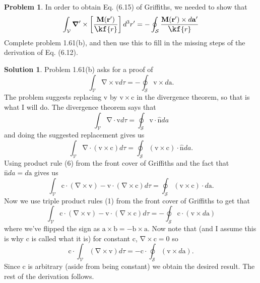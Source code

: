 \documentclass[10pt]{article}
\theoremstyle{definition}
\newtheorem{problem}{Problem}
\newtheorem{soln}{Solution}
\newcommand{\uv}[1]{\hat{\bv{{#1}}}}
\newcommand{\grd}{\nabla}
\newcommand{\scriptr}{\fontsize{12pt}{12pt}\kf{r}\fontsize{10pt}{10pt}}
\newcommand{\bv}[1]{\bm{\mathrm{#1}}}
\begin{document}
\begin{problem}
In order to obtain Eq. (6.15) of Griffiths, we needed to show that
$$\int_\mathcal{V}\bv{\grd}' \times \left[\frac{\bv{M}(\bv{r}')}{\scriptr}\right]d^3r'=-\oint_\mathcal{S}\frac{\bv{M}(\bv{r}')\times d\bv{a}'}{\scriptr}$$
Complete problem 1.61(b), and then use this to fill in the missing steps of the derivation of
Eq. (6.12).
\end{problem}
\begin{soln}
  Problem 1.61(b) asks for a proof of
  $$\int_{\mathcal{V}}\bv{\grd}\times \bv{v}d\tau = -\oint_\mathcal{S}\bv{v}\times d\bv{a}.$$
  The problem suggests replacing $\bv{v}$ by $\bv{v}\times \bv{c}$ in the divergence theorem, so that is what I will do.
  The divergence theorem says that
  $$\int_{\mathcal{V}}\bv{\grd}\cdot \bv{v} d\tau=\oint_\mathcal{S}\bv{v}\cdot \uv{n} da$$
  and doing the suggested replacement gives us
  $$\int_{\mathcal{V}}\bv{\grd}\cdot (\bv{v}\times \bv{c}) d\tau=\oint_\mathcal{S}(\bv{v}\times \bv{c})\cdot \uv{n} da.$$
  Using product rule (6) from the front cover of Griffiths and the fact that $\uv{n} da =d\bv{a}$ gives us
  $$\int_{\mathcal{V}} \bv{c}\cdot (\bv{\grd}\times \bv{v})-\bv{v}\cdot (\bv{\grd}\times \bv{c}) d\tau=\oint_\mathcal{S}(\bv{v}\times \bv{c})\cdot d\bv{a}.$$
  Now we use triple product rules (1) from the front cover of Griffiths to get that
  $$\int_{\mathcal{V}} \bv{c}\cdot (\bv{\grd}\times \bv{v})-\bv{v}\cdot (\bv{\grd}\times \bv{c}) d\tau=-\oint_\mathcal{S}\bv{c}\cdot (\bv{v}\times d\bv{a})$$
  where we've flipped the sign as $\bv{a}\times \bv{b} = -\bv{b}\times \bv{a}$. Now note that (and I assume this is why $\bv{c}$ is called what it is) for constant
  $\bv{c}$, $\bv{\grd}\times \bv{c}=0$ so
  $$\bv{c}\cdot \int_{\mathcal{V}} (\bv{\grd}\times \bv{v})d\tau=-\bv{c}\cdot \oint_\mathcal{S}(\bv{v}\times d\bv{a}).$$
  Since $\bv{c}$ is arbitrary (aside from being constant) we obtain the desired result. The rest of the derivation follows.
\end{soln}
\end{document}
